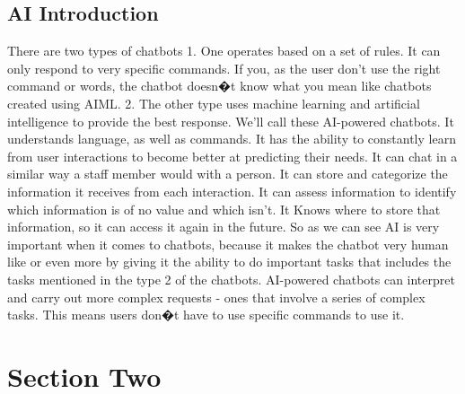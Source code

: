   \subsection{AI Introduction}
There are two types of chatbots
1. One operates based on a set of rules. It can only respond to very specific commands. If you, as the user don't use the right command or words, the chatbot doesn�t know what you mean like chatbots created using AIML.
2. The other type uses machine learning and artificial intelligence to provide the best response. We'll call these AI-powered chatbots. 
It understands language, as well as commands.
It has the ability to constantly learn from user interactions to become better at predicting their needs. 
It can chat in a similar way a staff member would with a person. 
It can store and categorize the information it receives from each interaction. 
It can assess information to identify which information is of no value and which isn't. 
It Knows where to store that information, so it can access it again in the future.
So as we can see AI is very important when it comes to chatbots, because it makes the chatbot very human like or even more by giving it the ability to do important tasks that includes the tasks mentioned in the type 2 of the chatbots.
AI-powered chatbots can interpret and carry out more complex requests - ones that involve a series of complex tasks. This means users don�t have to use specific commands to use it.

\section{Section Two}

